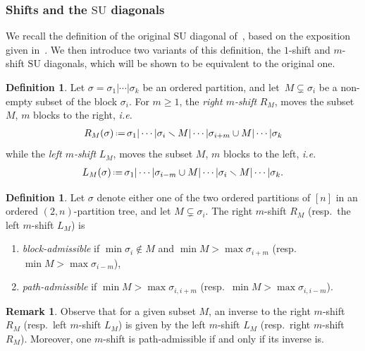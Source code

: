 \documentclass{amsart}
\newcommand{\darkblue}{\color{darkblue}} %
\theoremstyle{definition}
\newtheorem{definition}[theorem]{Definition}
\newtheorem{remark}[theorem]{Remark}
\newcommand{\ssm}{\smallsetminus} %
\newcommand{\eqdef}{\mbox{\,\raisebox{0.2ex}{\scriptsize\ensuremath{\mathrm:}}\ensuremath{=}\,}} %
\newcommand{\ie}{\textit{i.e.}~} %
\newcommand{\resp}{resp.~} %
\newcommand{\defn}[1]{\textsl{\darkblue #1}} %
\newcommand{\SU}{\mathrm{SU}}
\begin{document}

\subsubsection{Shifts and the $\SU$ diagonals}
\label{subsec:SU-shifts}

We recall the definition of the original $\SU$ diagonal of~\cite{SaneblidzeUmble}, based on the exposition given in~\cite{SaneblidzeUmble-comparingDiagonals}.
We then introduce two variants of this definition, the $1$-shift and $m$-shift $\SU$ diagonals, which will be shown to be equivalent to the original one.

\begin{definition}
\label{def:subset shifts}
Let $\sigma=\sigma_1| \cdots |\sigma_k$ be an ordered partition, and let~$M \subsetneq \sigma_{i}$ be a non-empty subset of the block $\sigma_i$.
For $m\geq 1$, the \defn{right $m$-shift} $R_M$, moves the subset $M$, $m$ blocks to the right, \ie
\begin{align*}
R_M(\sigma) \eqdef \sigma_1 | \cdots | \sigma_i \ssm M | \cdots | \sigma_{i+m} \cup M | \cdots | \sigma_k
\end{align*}
while the \defn{left $m$-shift} $L_M$, moves the subset $M$, $m$ blocks to the left, \ie
\begin{align*}
L_M(\sigma) \eqdef \sigma_1 | \cdots | \sigma_{i-m} \cup M | \cdots | \sigma_{i} \ssm M | \cdots | \sigma_k .
\end{align*}
\end{definition}

\begin{definition}
\label{def:movable-subsets}
Let $\sigma$ denote either one of the two ordered partitions of $[n]$ in an ordered \mbox{$(2,n)$-partition} tree, and let $M \subsetneq \sigma_i$.
The right $m$-shift $R_M$ (\resp the left $m$-shift $L_M$) is 
\begin{enumerate}
\item \defn{block-admissible} if $\min \sigma_i \notin M$ and $\min M > \max \sigma_{i+m}$ (\resp $\min M > \max \sigma_{i-m}$),
\item \defn{path-admissible} if $\min M > \max \sigma_{i,i+m}$ (\resp $\min M > \max \sigma_{i,i-m}$).
\end{enumerate}
\end{definition}

\begin{remark}
\label{rem:inverses}
Observe that for a given subset $M$, an inverse to the right $m$-shift $R_M$ (\resp left $m$-shift $L_M$) is given by the left $m$-shift $L_M$ (\resp right $m$-shift $R_M$).
Moreover, one $m$-shift is path-admissible if and only if its inverse is. 
\end{remark}
\end{document}
